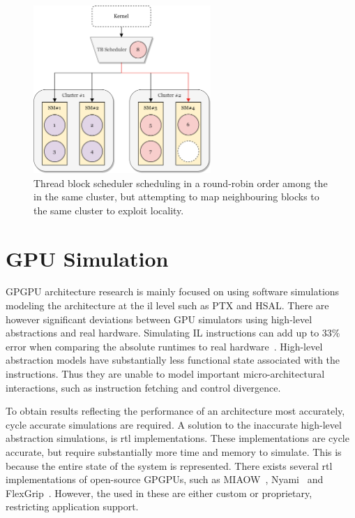 \begin{figure}
    \centering
    \includegraphics[width=0.6\textwidth]{figures/TB_scheduler.png}
    \caption[\acrshort{tb} scheduling]{Thread block scheduler scheduling  in a round-robin order among the  in the same cluster, but attempting to map neighbouring blocks to the same cluster to exploit locality.}
    \label{fig:tb_scheduler}
\end{figure}

\section{GPU Simulation} \label{sec:gpu_simulation}

GPGPU architecture research is mainly focused on using software simulations~\cite{gem5_gpu, gpu_sim_cuda, multi2sim} modeling the architecture at the \acrfull{il} level such as PTX and HSAL. There are however significant deviations between GPU simulators using high-level abstractions and real hardware. Simulating IL instructions can add up to 33\% error when comparing the absolute runtimes to real hardware~\cite{lost_in_abstraction}. High-level abstraction models have substantially less functional state associated with the instructions. Thus they are unable to model important micro-architectural interactions, such as instruction fetching and control divergence.

To obtain results reflecting the performance of an architecture most accurately, cycle accurate simulations are required. A solution to the inaccurate high-level abstraction simulations, is \acrfull{rtl} implementations. These implementations are cycle accurate, but require substantially more time and memory to simulate. This is because the entire state of the system is represented. There exists several \acrshort{rtl} implementations of open-source GPGPUs, such as MIAOW~\cite{MIAOW}, Nyami~\cite{Nyami} and FlexGrip~\cite{FlexGrip}. However, the  used in these  are either custom or proprietary, restricting application support.

